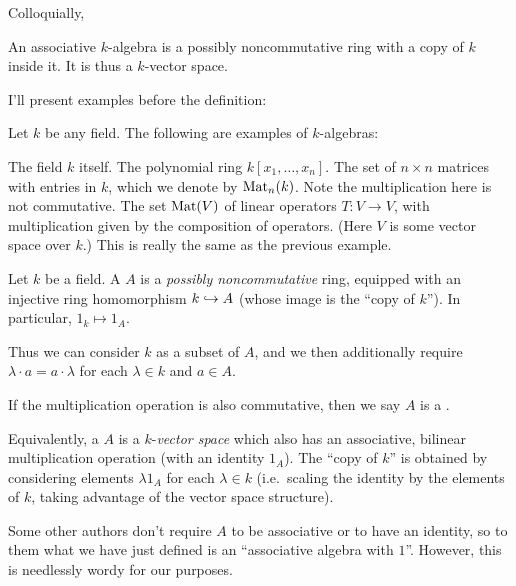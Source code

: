 Colloquially,
\begin{moral}
	An associative $k$-algebra is
	a possibly noncommutative ring with a copy of $k$ inside it.
	It is thus a $k$-vector space.
\end{moral}
I'll present examples before the definition:
\begin{example}
	Let $k$ be any field. The following are examples of $k$-algebras:
	\begin{enumerate}[(a)]
		\ii The field $k$ itself.
		\ii The polynomial ring $k[x_1, \dots, x_n]$.
		\ii The set of $n \times n$ matrices with entries in $k$,
		which we denote by $\mathrm{Mat}_n(k)$.
		Note the multiplication here is not commutative.
		\ii The set $\mathrm{Mat}(V)$ of linear operators $T \colon V \to V$,
		with multiplication given by the composition of operators.
		(Here $V$ is some vector space over $k$.)
		This is really the same as the previous example.
	\end{enumerate}
\end{example}
\begin{definition}
	Let $k$ be a field.
	A  $A$ is a \emph{possibly noncommutative} ring,
	equipped with an injective ring homomorphism $k \hookrightarrow A$
	(whose image is the ``copy of $k$'').
	In particular, $1_k \mapsto 1_A$.

	Thus we can consider $k$ as a subset of $A$, and
	we then additionally require $\lambda \cdot a = a \cdot \lambda$
	for each $\lambda \in k$ and $a \in A$.

	If the multiplication operation is also commutative,
	then we say $A$ is a .
\end{definition}
\begin{definition}
	Equivalently, a  $A$ is a
	$k$-\emph{vector space} which also has an associative,
	bilinear multiplication operation (with an identity $1_A$).
	The ``copy of $k$'' is obtained by considering elements
	$\lambda 1_A$ for each $\lambda \in k$
	(i.e.\ scaling the identity by the elements of $k$,
	taking advantage of the vector space structure).
\end{definition}

\begin{abuse}
	Some other authors don't require $A$ to be associative or to have
	an identity, so to them what we have just defined is an
	``associative algebra with $1$''.
	However, this is needlessly wordy for our purposes.
\end{abuse}

